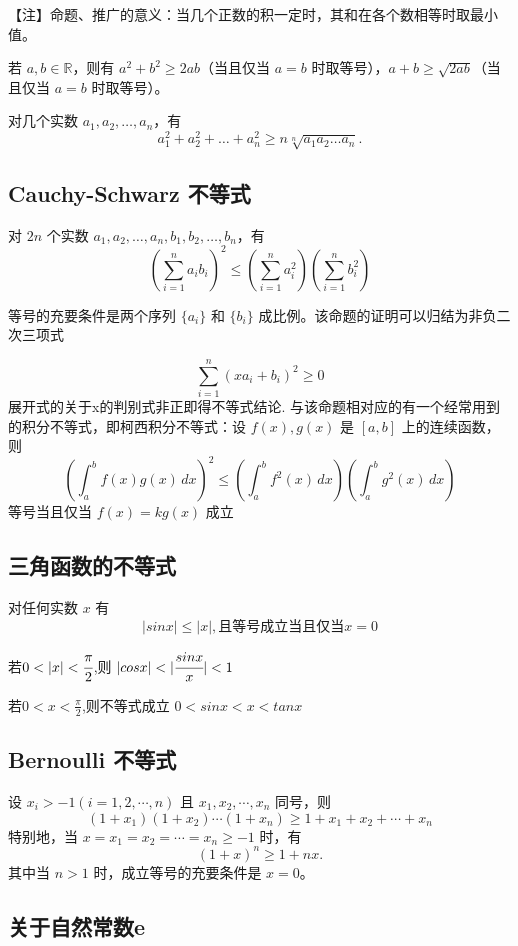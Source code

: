 \documentclass{article}
\numberwithin{equation}{section}
\begin{document}
【注】命题、推广的意义：当几个正数的积一定时，其和在各个数相等时取最小值。

若 $a, b \in \mathbb{R}$，则有 $a^2 + b^2 \geq 2ab$（当且仅当 $a = b$ 时取等号），$a + b \geq \sqrt{2ab}$（当且仅当 $a = b$ 时取等号）。

对几个实数 $a_1, a_2, \dots, a_n$，有
\[
a_1^2 + a_2^2 + \dots + a_n^2 \geq n \sqrt[n]{a_1 a_2 \dots a_n}.
\]

\subsection{Cauchy-Schwarz 不等式}
对 $2n$ 个实数 $a_1, a_2, \dots, a_n, b_1, b_2, \dots, b_n$，有
\[
\left( \sum_{i=1}^n a_i b_i \right)^2 \leq \left( \sum_{i=1}^n a_i^2 \right) \left( \sum_{i=1}^n b_i^2 \right)
\]


等号的充要条件是两个序列 $\{a_i\}$ 和 $\{b_i\}$ 成比例。该命题的证明可以归结为非负二次三项式

\[
\sum_{i=1}^n (xa_i + b_i)^2 \geq 0
\]
展开式的关于x的判别式非正即得不等式结论. 与该命题相对应的有一个经常用到的积分不等式，即柯西积分不等式：设 $f(x), g(x)$ 是 $[a,b]$ 上的连续函数，则
\[
\left( \int_a^b f(x)g(x) \, dx \right)^2 \leq \left( \int_a^b f^2(x) \, dx \right) \left( \int_a^b g^2(x) \, dx \right)
\]
等号当且仅当 $f(x) = k g(x)$ 成立

\subsection{三角函数的不等式}

对任何实数 $x$ 有
\[
| sin x| \leq |x|,\text{且等号成立当且仅当} x = 0
\]

若\( 0 < |x| < \cfrac{\pi}{2} \),则 \( |cosx| < | \cfrac{sinx}{x} | < 1 \)

若\( 0 < x < \frac{\pi}{2} \),则不等式成立 \( 0 < sinx < x < tanx \)

\subsection{Bernoulli 不等式}
设 $x_i > -1(i=1,2, \cdots, n)$ 且 $x_1, x_2, \cdots, x_n $ 同号，则
\[
(1 + x_1)(1 + x_2)\cdots(1 + x_n) \geq 1 + x_1 + x_2 + \cdots + x_n
\]
特别地，当 $x = x_1 = x_2 = \cdots = x_n \geq -1 $ 时，有
\[
(1 + x)^n \geq 1 + nx.
\]
其中当 $n > 1$ 时，成立等号的充要条件是 $x = 0$。

\subsection{关于自然常数e}
\end{document}
